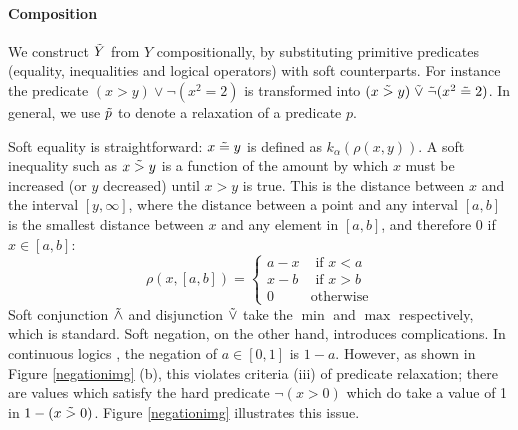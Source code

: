\paragraph{Composition} We construct $\tilde{Y}$ from $Y$ compositionally, by substituting primitive predicates (equality, inequalities and logical operators) with soft counterparts.
For instance the predicate $(x > y) \lor \neg(x^2 = 2)$ is transformed into $(x \mathrel{\tilde{>}} y) \mathrel{\tilde{\lor}} \tilde{\neg}(x^2 \mathrel{\tilde{=}} 2)$.
In general, we use $\mathrel{\tilde{p}}$ to denote a relaxation of a predicate $p$.

Soft equality is straightforward: $x \mathrel{\tilde{=}} y$ is defined as $k_\alpha(\rho(x, y))$.
A soft inequality such as $x \mathrel{\tilde{>}} y$ is a function of the amount by which $x$ must be increased (or $y$ decreased) until $x > y$ is true.
This is the distance between $x$ and the interval $[y, \infty]$, where the distance between a point and any interval $[a, b]$ is the smallest distance between $x$ and any element in $[a, b]$, and therefore 0 if $x \in [a, b]$:
\begin{equation}
\rho(x, [a, b]) =
\begin{cases}
  a - x & \text{ if } x < a\\
  x - b & \text{ if } x > b\\
  0              & \text{otherwise}
\end{cases}
\end{equation}
Soft conjunction $\mathrel{\tilde{\land}}$ and disjunction $\mathrel{\tilde{\lor}}$ take the $\min$ and $\max$ respectively, which is standard.
Soft negation, on the other hand, introduces complications.
In continuous logics \cite{kimmig2012short}, the negation of $a \in [0, 1]$ is $1 - a$.
However, as shown in Figure \ref{negationimg} (b), this violates criteria (iii) of predicate relaxation; there are values which satisfy the hard predicate $\neg(x > 0)$ which do take a value of 1 in $1 - (x \mathrel{\tilde{>}} 0)$.
Figure \ref{negationimg} illustrates this issue.



